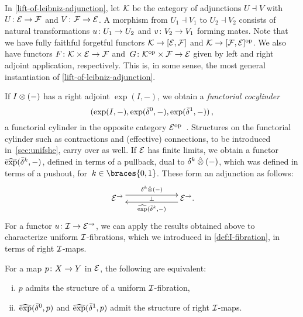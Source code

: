\documentclass[reqno,10pt,a4paper,oneside,draft]{amsart}
\begin{document}
\begin{remark} \label{pitchfork-leibniz-most-general-example}
In \cref{lift-of-leibniz-adjunction}, let $\cal{K}$ be the category of adjunctions $U \dashv V$ with $U \co \catE \to \cal{F}$ and $V \co \cal{F} \to \catE$.
A morphism from $U_1 \dashv V_1$ to $U_2 \dashv V_2$ consists of natural transformations $u \co U_1 \to U_2$ and $v \co V_2 \to V_1$ forming mates.
Note that we have fully faithful forgetful functors $\cal{K} \to [\catE, \cal{F}]$ and $\cal{K} \to [\cal{F}, \catE]^{\op}$.
We also have functors $F \co \cal{K} \times \catE \to \cal{F}$ and~$G \co \cal{K}^{\op} \times \cal{F} \to \catE$ given by left and right adjoint application, respectively.
This is, in some sense, the most general instantiation of \cref{lift-of-leibniz-adjunction}.
\end{remark}

If $\interval \otimes (-)$ has a right adjoint $\exp(I, -)$, we obtain a \emph{functorial cocylinder} \[
(\exp(\interval, -), \exp(\bar{\delta}^0, -), \exp(\bar{\delta}^1, -)) \, ,
\] 
\ie a functorial cylinder in the opposite category $\catE^{\op}$~\cite{kamps-porter:homotopy}.
Structures on the functorial cylinder such as contractions and (effective) connections, to
be introduced in~\cref{sec:unifshe}, carry over as well.
If $\calE$ has finite limits, we obtain a functor $\hatexp(\bar{\delta}^k, -)$, defined in terms of a pullback, dual to $\kcyl \hatotimes (-)$, which was defined in terms of a pushout, for~$k \in \braces{0, 1}$.
These form an adjunction as follows:
\[
\xymatrix@C+4em{
  \catE^\to
  \ar@<1ex>[r]^{\kcyl \hatotimes (-)}
  \ar@{}[r]|{\bot}
&
  \catE^\to
  \ar@<1ex>[l]^{\hatexp(\bar{\delta}^k, -)}
\rlap{.}}
\]
For a functor $u \co \cal{I} \to \catE^\to$, we can apply the results obtained above to characterize uniform $\cal{I}$-fibrations, which we introduced in \cref{def:I-fibration}, in terms of right $\cal{I}$-maps.

\begin{proposition} \label{prod-exp-general}
For a map $p \co X \to Y$ in $\catE$, the following are equivalent:
\begin{enumerate}[(i)]
\item $p$ admits the structure of a uniform $\cal{I}$-fibration,
\item $\hatexp(\bar{\delta}^0, p)$ and $\hatexp(\bar{\delta}^1, p)$ admit the structure of right $\cal{I}$-maps.
\end{enumerate}
\end{proposition}
\end{document}
